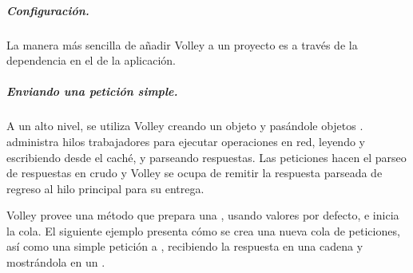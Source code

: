 \subparagraph{Configuración.}
\label{\detokenize{dev_docs:id2}}
La manera más sencilla de añadir Volley a un proyecto es a través de la dependencia
en el  de la aplicación.

%
\begin{sphinxVerbatim}[commandchars=\\\{\}]
 
 
\end{sphinxVerbatim}


\subparagraph{Enviando una petición simple.}
\label{\detokenize{dev_docs:enviando-una-peticion-simple}}
A un alto nivel, se utiliza Volley creando un objeto  y
pasándole objetos .  administra hilos trabajadores
para ejecutar operaciones en red, leyendo y escribiendo desde el caché, y
parseando respuestas. Las peticiones hacen el parseo de respuestas en crudo
y Volley se ocupa de remitir la respuesta parseada de regreso al hilo principal
para su entrega.

Volley provee una método  que prepara una
, usando valores por defecto, e inicia la cola. El
siguiente ejemplo presenta cómo se crea una nueva cola de peticiones,
así como una simple petición  a , recibiendo  la respuesta
en una cadena y mostrándola en un .

